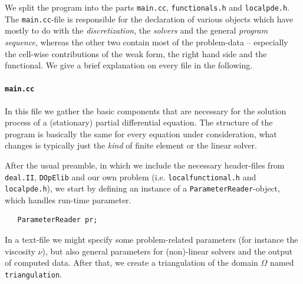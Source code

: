 \documentclass[prodmode,acmtoms]{acmsmall}
\numberwithin{equation}{section}
\newcommand{\deal}{\texttt{deal.II}}
\newcommand{\dope}{\texttt{DOpElib}}
\begin{document}
We split the program into the parts \texttt{main.cc}, \texttt{functionals.h} and \texttt{localpde.h}. The \texttt{main.cc}-file is responsible for the declaration of various objects which have mostly to do with the \textit{discretization}, the \textit{solvers} and the general \textit{program sequence}, whereas the other two contain most of the problem-data -- especially the cell-wise contributions of the weak form, the right hand side and the functional. We give a brief explanation on every file in the following.

\paragraph{\texttt{main.cc}}
In this file we gather the basic components that are necessary for the solution process of a (stationary) partial differential equation. The structure of the program is basically the same for every equation under consideration, what changes is typically just the \textit{kind} of  finite element or the linear solver.  

After the usual preamble, in which we include the necessary header-files from \deal{}, \dope{} and our own problem (i.e. \texttt{localfunctional.h} and \texttt{localpde.h}), we start by defining an instance of a \texttt{ParameterReader}-object, which handles run-time parameter.
\begin{lstlisting}
   ParameterReader pr;
\end{lstlisting}
In a text-file we might specify some problem-related parameters (for instance the viscosity $\nu$), but also general parameters for (non)-linear solvers and the output of computed data. 
After that, we create a triangulation of the domain $\Omega$ named \texttt{triangulation}.
\end{document}
